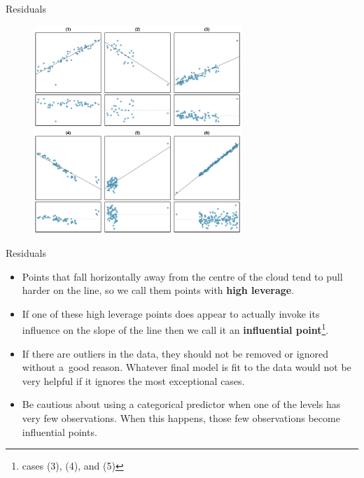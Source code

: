 \documentclass[12pt,a4paper]{beamer}
\begin{document}
		\begin{frame}{Residuals}
			\begin{figure}
			\centering
			\includegraphics[width=0.7\textwidth]{figures/outlierPlots/outlierPlots}
	\end{figure}
			\end{frame}	
			\begin{frame}{Residuals}
			\small	\begin{itemize}
					\item Points that fall horizontally away from the centre of the cloud tend to pull harder on the line, so we call them points with \textbf{high leverage}.
\item If one of these high leverage points does appear to actually invoke its influence on the slope of the line  then we call it an \textbf{influential point}\footnote{ cases (3), (4), and (5)}.
\item If there are outliers in the data, they should not be removed or ignored without a~good reason. Whatever final model is fit to the data would not be very helpful if it ignores the most exceptional cases.
\item Be cautious about using a categorical predictor when one of the levels has very few observations. When this happens, those few observations become influential points.
				\end{itemize}
			\end{frame}
\end{document}
